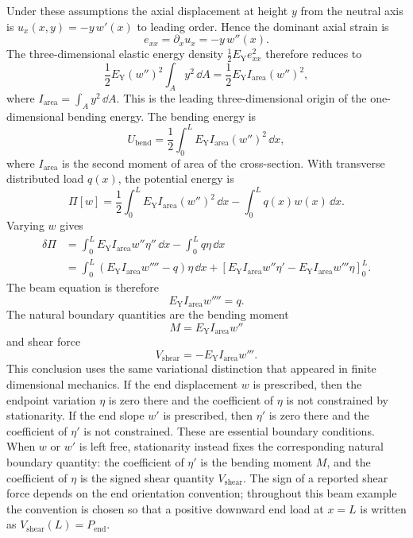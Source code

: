 Under these assumptions the axial displacement at height \(y\) from the neutral
axis is \(u_x(x,y)=-y\,w'(x)\) to leading order. Hence the dominant axial strain
is
\[
  e_{xx}=\partial_xu_x=-y\,w''(x).
\]
The three-dimensional elastic energy density
\(\frac12 E_{\mathrm Y}e_{xx}^2\) therefore reduces to
\[
  \frac12 E_{\mathrm Y}(w'')^2\int_A y^2\,\dd A
  =
  \frac12 E_{\mathrm Y}I_{\mathrm{area}}(w'')^2,
\]
where \(I_{\mathrm{area}}=\int_A y^2\,\dd A\). This is the leading
three-dimensional origin of the one-dimensional bending energy.
The bending energy is
\[
  U_{\mathrm{bend}}
  =
  \frac12\int_0^L E_{\mathrm Y}I_{\mathrm{area}}(w'')^2\,\dd x,
\]
where \(I_{\mathrm{area}}\) is the second moment of area of the cross-section.
With transverse distributed load \(q(x)\), the potential energy is
\[
  \Pi[w]
  =
  \frac12\int_0^L E_{\mathrm Y}I_{\mathrm{area}}(w'')^2\,\dd x
  -
  \int_0^L q(x)w(x)\,\dd x.
\]
Varying \(w\) gives
\[
\begin{aligned}
  \delta\Pi
  &=
  \int_0^L E_{\mathrm Y}I_{\mathrm{area}}w''\eta''\,\dd x
  -
  \int_0^L q\eta\,\dd x\\
  &=
  \int_0^L
  \left(E_{\mathrm Y}I_{\mathrm{area}}w''''-q\right)\eta\,\dd x
  +
  \left[
    E_{\mathrm Y}I_{\mathrm{area}}w''\eta'
    -
    E_{\mathrm Y}I_{\mathrm{area}}w'''\eta
  \right]_{0}^{L}.
\end{aligned}
\]
The beam equation is therefore
\[
  \boxed{
  E_{\mathrm Y}I_{\mathrm{area}}w''''=q.
  }
\]
The natural boundary quantities are the bending moment
\[
  M=E_{\mathrm Y}I_{\mathrm{area}}w''
\]
and shear force
\[
  V_{\mathrm{shear}}=-E_{\mathrm Y}I_{\mathrm{area}}w'''.
\]
This conclusion uses the same variational distinction that appeared in finite
dimensional mechanics.  If the end displacement \(w\) is prescribed, then the
endpoint variation \(\eta\) is zero there and the coefficient of \(\eta\) is
not constrained by stationarity.  If the end slope \(w'\) is prescribed, then
\(\eta'\) is zero there and the coefficient of \(\eta'\) is not constrained.
These are essential boundary conditions.  When \(w\) or \(w'\) is left free,
stationarity instead fixes the corresponding natural boundary quantity: the
coefficient of \(\eta'\) is the bending moment \(M\), and the coefficient of
\(\eta\) is the signed shear quantity \(V_{\mathrm{shear}}\).  The sign of a
reported shear force depends on the end orientation convention; throughout this
beam example the convention is chosen so that a positive downward end load at
\(x=L\) is written as \(V_{\mathrm{shear}}(L)=P_{\mathrm{end}}\).

